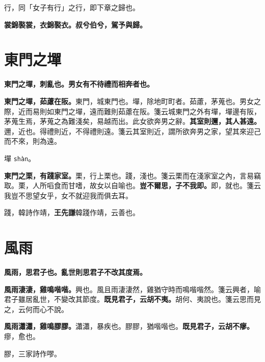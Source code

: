\begin{quoting}行，同「女子有行」之行，即下章之歸也。\end{quoting}

\textbf{裳錦褧裳，衣錦褧衣。叔兮伯兮，駕予與歸。}

\section{東門之墠}


\textbf{東門之墠，刺亂也。男女有不待禮而相奔者也。}

\textbf{東門之墠，茹藘在阪。}{\footnotesize 東門，城東門也。墠，除地町町者。茹藘，茅蒐也。男女之際，近而易則如東門之墠，遠而難則茹藘在阪。箋云城東門之外有墠，墠邊有阪，茅蒐生焉，茅蒐之為難淺矣，易越而出。此女欲奔男之辭。}\textbf{其室則邇，其人甚遠。}{\footnotesize 邇，近也。得禮則近，不得禮則遠。箋云其室則近，謂所欲奔男之家，望其來迎己而不來，則為遠。}

\begin{quoting}墠 \texttt{shàn}。\end{quoting}

\textbf{東門之栗，有踐家室。}{\footnotesize 栗，行上栗也。踐，淺也。箋云栗而在淺家室之內，言易竊取。栗，人所㗖食而甘嗜，故女以自喻也。}\textbf{豈不爾思，子不我即。}{\footnotesize 即，就也。箋云我豈不思望女乎，女不就迎我而俱去耳。}

\begin{quoting}踐，韓詩作靖，\textbf{王先謙}韓踐作靖，云善也。\end{quoting}

\section{風雨}


\textbf{風雨，思君子也。亂世則思君子不改其度焉。}

\textbf{風雨淒淒，雞鳴喈喈。}{\footnotesize 興也。風且雨淒淒然，雞猶守時而鳴喈喈然。箋云興者，喻君子雖居亂世，不變改其節度。}\textbf{既見君子，云胡不夷。}{\footnotesize 胡何、夷說也。箋云思而見之，云何而心不說。}

\textbf{風雨瀟瀟，雞鳴膠膠。}{\footnotesize 瀟瀟，暴疾也。膠膠，猶喈喈也。}\textbf{既見君子，云胡不瘳。}{\footnotesize 瘳，愈也。}

\begin{quoting}膠，三家詩作嘐。\end{quoting}


